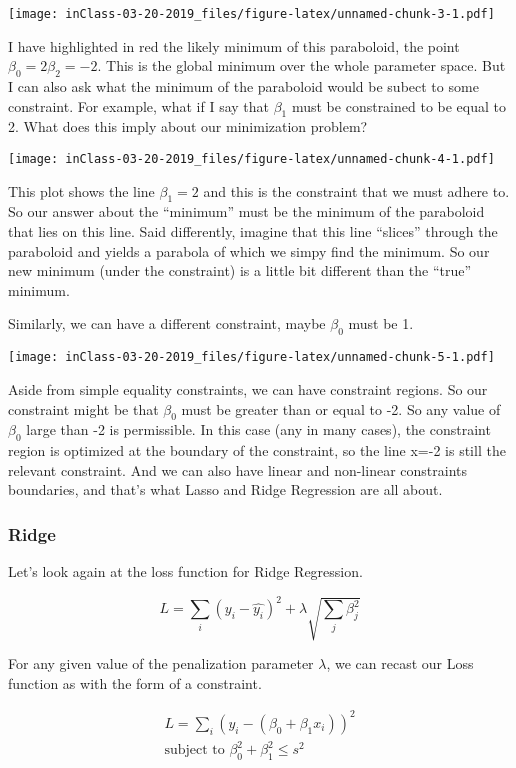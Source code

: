 \documentclass[]{article}
\begin{document}
\texttt{[image: inClass-03-20-2019\_files/figure-latex/unnamed-chunk-3-1.pdf]}

I have highlighted in red the likely minimum of this paraboloid, the
point \(\beta_0=2 \beta_2=-2\). This is the global minimum over the
whole parameter space. But I can also ask what the minimum of the
paraboloid would be subect to some constraint. For example, what if I
say that \(\beta_1\) must be constrained to be equal to 2. What does
this imply about our minimization problem?

\texttt{[image: inClass-03-20-2019\_files/figure-latex/unnamed-chunk-4-1.pdf]}

This plot shows the line \(\beta_1=2\) and this is the constraint that
we must adhere to. So our answer about the ``minimum'' must be the
minimum of the paraboloid that lies on this line. Said differently,
imagine that this line ``slices'' through the paraboloid and yields a
parabola of which we simpy find the minimum. So our new minimum (under
the constraint) is a little bit different than the ``true'' minimum.

Similarly, we can have a different constraint, maybe \(\beta_0\) must be
1.

\texttt{[image: inClass-03-20-2019\_files/figure-latex/unnamed-chunk-5-1.pdf]}

Aside from simple equality constraints, we can have constraint regions.
So our constraint might be that \(\beta_0\) must be greater than or
equal to -2. So any value of \(\beta_0\) large than -2 is permissible.
In this case (any in many cases), the constraint region is optimized at
the boundary of the constraint, so the line x=-2 is still the relevant
constraint. And we can also have linear and non-linear constraints
boundaries, and that's what Lasso and Ridge Regression are all about.

\subsubsection{Ridge}\label{ridge}

Let's look again at the loss function for Ridge Regression.

\[
L = \sum_i (y_i - \hat{y_i})^2 + \lambda \sqrt{\sum_j \beta_j ^2}
\]

For any given value of the penalization parameter \(\lambda\), we can
recast our Loss function as with the form of a constraint.

\[
\begin{aligned}
L = \sum_i (y_i - (\beta_0 + \beta_1 x_i))^2  \\
\textrm{subject to } \beta_0^2 + \beta_1^2 \le s^2
\end{aligned}
\]
\end{document}

